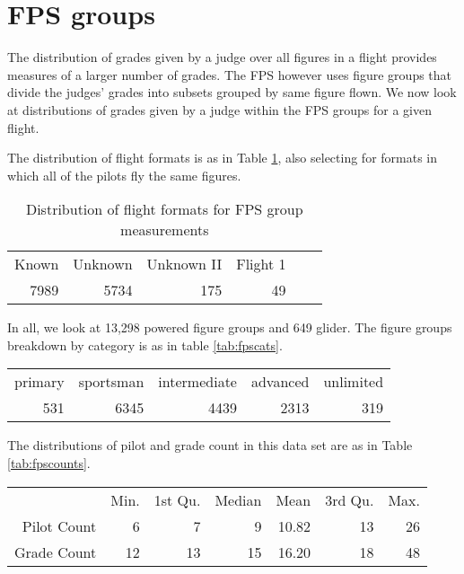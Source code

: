 \section{FPS groups}

The distribution of grades given by a judge over all figures in a flight
provides measures of a larger number of grades. The FPS however uses figure
groups that divide the judges' grades into subsets grouped by same figure
flown.  We now look at distributions of grades given by a judge within the FPS
groups for a given flight.

The distribution of flight formats is as in Table
\ref{tab:fpsformat}, also selecting for formats in which all of the pilots
fly the same figures.

\begin{table}[tbp]
  \centering
  \begin{tabular}{r r r r r r}
  Known & Unknown & Unknown II & Flight 1 \\
  7989 & 5734 & 175 & 49 \\
  \end{tabular}
  \caption{Distribution of flight formats for FPS group measurements}
  \label{tab:fpsformat}
\end{table}

In all, we look at 13,298 powered figure groups and 649 glider. The figure
groups breakdown by category is as in table \ref{tab:fpscats}.

\begin{table*}[tbp]
  \begin{tabular}{r r r r r}
  primary  & sportsman & intermediate  &  advanced  & unlimited  \\
      531  &      6345 &         4439  &      2313  &       319  \\
  \end{tabular}
  \caption{Distribution of categories for FPS group measurements}
  \label{tab:fpscats}
\end{table*}

The distributions of pilot and grade count in this data set are as in
Table \ref{tab:fpscounts}.

\begin{table*}[tbp]
  \begin{tabular}{r | r r r r r r}
  & Min. & 1st Qu. & Median & Mean & 3rd Qu. & Max. \\
  Pilot Count &  6 &  7 &  9 & 10.82 &  13 &  26 \\
  Grade Count & 12 & 13 & 15 & 16.20 & 18 & 48 \\
  \end{tabular}
  \caption{Distribution of pilot and grade counts for FPS group measurements}
  \label{tab:fpscounts}
\end{table*}

